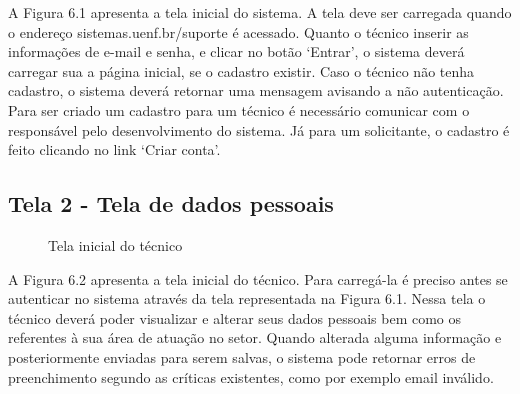 A Figura 6.1 apresenta a tela inicial do sistema. A tela deve ser carregada quando o endereço sistemas.uenf.br/suporte é acessado. Quanto o técnico inserir as informações de e-mail e senha, e clicar no botão ‘Entrar’, o sistema deverá carregar sua a página inicial, se o cadastro existir. Caso o técnico não tenha cadastro, o sistema deverá retornar uma mensagem avisando a não autenticação. Para ser criado um cadastro para um técnico é necessário comunicar com o responsável pelo desenvolvimento do sistema. Já para um solicitante, o cadastro é feito clicando no link ‘Criar conta’.

\newpage

\subsection{Tela 2 - Tela de dados pessoais}

\begin{figure}[ht]
    \centering
    \caption{Tela inicial do técnico}
\end{figure}

A Figura 6.2 apresenta a tela inicial do técnico. Para carregá-la é preciso antes se autenticar no sistema através da tela representada na Figura 6.1. Nessa tela o técnico deverá poder visualizar e alterar seus dados pessoais bem como os referentes à sua área de atuação no setor. Quando alterada alguma informação e posteriormente enviadas para serem salvas, o sistema pode retornar erros de preenchimento segundo as críticas existentes, como por exemplo email inválido. 

